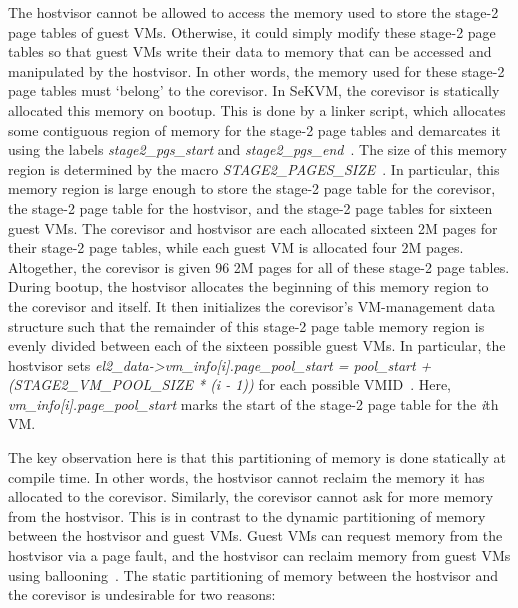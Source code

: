 The hostvisor cannot be allowed to access the memory used to store
the stage-2 page tables of guest VMs. Otherwise, it could simply modify these
stage-2 page tables so that guest VMs write their data to memory that can be
accessed and manipulated by the hostvisor. In other words, the memory used for
these stage-2 page tables must `belong' to the corevisor. In SeKVM,
the corevisor is statically allocated this memory on bootup. This is done by
a linker script, which allocates some
contiguous region of memory for the stage-2 page tables and demarcates it using the labels \textit{stage2\_pgs\_start}
and \textit{stage2\_pgs\_end}~\cite{vmlinux.lds.S}. The size of this memory region is
determined by the macro \textit{STAGE2\_PAGES\_SIZE}~\cite{kernel-pgtable.h}. In
particular, this memory region is large enough to store the stage-2 page table
for the corevisor, the stage-2 page table for the hostvisor,
and the stage-2 page tables for sixteen guest VMs. The corevisor and hostvisor are
each allocated sixteen 2M pages for their stage-2 page tables, while each guest VM
is allocated four 2M pages. Altogether, the corevisor is given 96 2M
pages for all of these stage-2 page tables. During bootup, the hostvisor
allocates the beginning of this memory region to the corevisor and itself. It then
initializes the corevisor's VM-management data structure such that the remainder of this stage-2 page table memory region
is evenly divided between each of the sixteen possible guest VMs. In particular, the hostvisor sets
\textit{el2\_data->vm\_info[i].page\_pool\_start =
pool\_start + (STAGE2\_VM\_POOL\_SIZE * (i - 1))} for each possible VMID~\cite{el1.c}.
Here, \textit{vm\_info[i].page\_pool\_start} marks the start of the stage-2
page table for the \textit{i}th VM.

The key observation here is that this partitioning of memory is done statically
at compile time. In other words, the hostvisor cannot reclaim the memory it has
allocated to the corevisor. Similarly, the corevisor cannot ask for more memory
from the hostvisor. This is in contrast to the dynamic partitioning of memory
between the hostvisor and guest VMs. Guest VMs can request memory from the
hostvisor via a page fault, and the hostvisor can reclaim memory from guest VMs
using ballooning~\cite{hypsec}. The static partitioning of memory between the
hostvisor and the corevisor is undesirable for two reasons:


